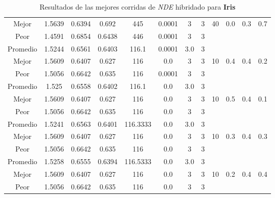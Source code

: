 \begin{table}[h!]
\begin{center}
\begin{tabular}{|c|c|c|c|c|c|c|c|c|c|c|c|}
            Mejor & 1.5639 & 0.6394  & 0.692 & 445 & 0.0001 & 3 & 3 & 40 & 0.0 & 0.3 & 0.7\\
            \cline{1-8}
            Peor & 1.4591 & 0.6854  & 0.6438 & 446 & 0.0001 & 3 & 3 &  &  &  & \\
        \hline
        \hline
            Promedio  & 1.5244 & 0.6561 & 0.6403 & 116.1 & 0.0001 & 3.0 & 3 &  &  &  & \\
            \cline{1-8}
            Mejor & 1.5609 & 0.6407  & 0.627 & 116 & 0.0 & 3 & 3 & 10 & 0.4 & 0.4 & 0.2\\
            \cline{1-8}
            Peor & 1.5056 & 0.6642  & 0.635 & 116 & 0.0001 & 3 & 3 &  &  &  & \\
        \hline
        \hline
            Promedio  & 1.525 & 0.6558 & 0.6402 & 116.1 & 0.0 & 3.0 & 3 &  &  &  & \\
            \cline{1-8}
            Mejor & 1.5609 & 0.6407  & 0.627 & 116 & 0.0 & 3 & 3 & 10 & 0.5 & 0.4 & 0.1\\
            \cline{1-8}
            Peor & 1.5056 & 0.6642  & 0.635 & 116 & 0.0 & 3 & 3 &  &  &  & \\
        \hline
        \hline
            Promedio  & 1.5241 & 0.6563 & 0.6401 & 116.3333 & 0.0 & 3.0 & 3 &  &  &  & \\
            \cline{1-8}
            Mejor & 1.5609 & 0.6407  & 0.627 & 116 & 0.0 & 3 & 3 & 10 & 0.3 & 0.4 & 0.3\\
            \cline{1-8}
            Peor & 1.5056 & 0.6642  & 0.635 & 116 & 0.0 & 3 & 3 &  &  &  & \\
        \hline
        \hline
            Promedio  & 1.5258 & 0.6555 & 0.6394 & 116.5333 & 0.0 & 3.0 & 3 &  &  &  & \\
            \cline{1-8}
            Mejor & 1.5609 & 0.6407  & 0.627 & 116 & 0.0 & 3 & 3 & 10 & 0.2 & 0.4 & 0.4\\
            \cline{1-8}
            Peor & 1.5056 & 0.6642  & 0.635 & 116 & 0.0 & 3 & 3 &  &  &  & \\
        \hline
        \end{tabular}
        \caption{Resultados de las mejores corridas de \emph{NDE} hibridado para {\bf Iris}}
        \label{tb:tabledehibcsv}
    \end{center}
\end{table}


